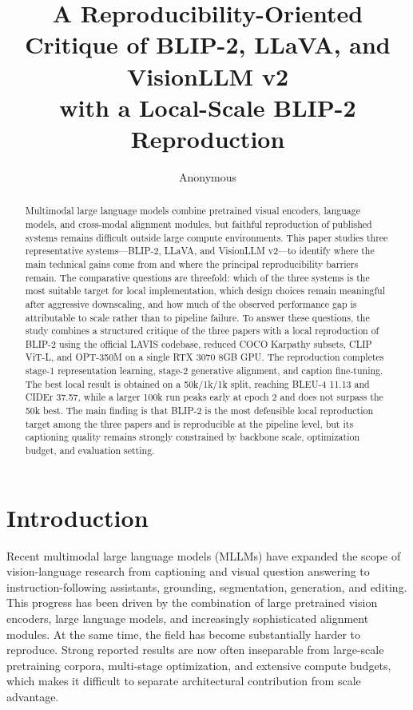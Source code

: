 \documentclass[11pt]{article}
\title{A Reproducibility-Oriented Critique of BLIP-2, LLaVA, and VisionLLM v2\\
with a Local-Scale BLIP-2 Reproduction}
\author{Anonymous}
\begin{document}
\maketitle

\begin{abstract}
Multimodal large language models combine pretrained visual encoders, language models,
and cross-modal alignment modules, but faithful reproduction of published systems
remains difficult outside large compute environments. This paper studies three
representative systems---BLIP-2, LLaVA, and VisionLLM v2---to identify where the
main technical gains come from and where the principal reproducibility barriers
remain. The comparative questions are threefold: which of the three systems is the
most suitable target for local implementation, which design choices remain
meaningful after aggressive downscaling, and how much of the observed performance
gap is attributable to scale rather than to pipeline failure. To answer these
questions, the study combines a structured critique of the three papers with a local
reproduction of BLIP-2 using the official LAVIS codebase, reduced COCO Karpathy
subsets, CLIP ViT-L, and OPT-350M on a single RTX 3070 8GB GPU. The reproduction
completes stage-1 representation learning, stage-2 generative alignment, and caption
fine-tuning. The best local result is obtained on a 50k/1k/1k split, reaching
BLEU-4 11.13 and CIDEr 37.57, while a larger 100k run peaks early at epoch 2 and
does not surpass the 50k best. The main finding is that BLIP-2 is the most
defensible local reproduction target among the three papers and is reproducible at the
pipeline level, but its captioning quality remains strongly constrained by backbone
scale, optimization budget, and evaluation setting.
\end{abstract}

\section{Introduction}
Recent multimodal large language models (MLLMs) have expanded the scope of
vision-language research from captioning and visual question answering to
instruction-following assistants, grounding, segmentation, generation, and editing.
This progress has been driven by the combination of large pretrained vision
encoders, large language models, and increasingly sophisticated alignment modules.
At the same time, the field has become substantially harder to reproduce. Strong
reported results are now often inseparable from large-scale pretraining corpora,
multi-stage optimization, and extensive compute budgets, which makes it difficult to
separate architectural contribution from scale advantage.
\end{document}
